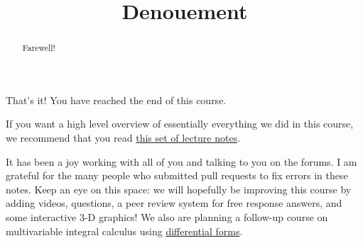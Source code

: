 \documentclass{ximera}
\title{Denouement}
\begin{document}
	\begin{abstract}
		Farewell!
	\end{abstract}\maketitle
	
	That's it!  You have reached the end of this course.
	
	If you want a high level overview of essentially everything we
        did in this course, we recommend that you read
        \href{http://math.caltech.edu/~ma108a/notesderivatice.pdf}{this
          set of lecture notes}.
	
	It has been a joy working with all of you and talking to you
        on the forums.  I am grateful for the many people who
        submitted pull requests to fix errors in these notes.  Keep an
        eye on this space: we will hopefully be improving this course
        by adding videos, questions, a peer review system for free
        response answers, and some interactive 3-D graphics!  We also
        are planning a follow-up course on multivariable integral
        calculus using
        \href{http://en.wikipedia.org/wiki/Differential_form}{differential
          forms}.
\end{document}
